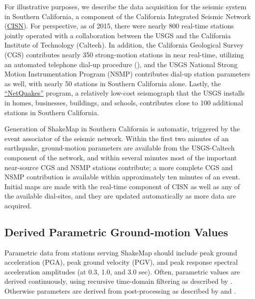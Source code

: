 \documentclass[letterpaper,10pt,english]{sphinxmanual}
\begin{document}
For illustrative purposes, we describe the data acquisition for the seismic system in
Southern California, a component of the California Integrated Seismic Network (\href{http://www.cisn.org}{CISN}).
For perspective, as of 2015, there were nearly 800 real-time stations jointly operated with
a collaboration between the USGS and the California Institute of Technology (Caltech). In addition, the California Geological Survey (CGS)
contributes nearly 350 strong-motion stations in near real-time, utilizing an automated
telephone dial-up procedure ({\hyperref[references:shakal1998]{}}), and the USGS National Strong Motion
Instrumentation Program (NSMP) contributes dial-up station parameters as well, with
nearly 50 stations in Southern California alone.  Lastly, the
\href{http://earthquake.usgs.gov/monitoring/netquakes/map}{``NetQuakes''} program, a
relatively low-cost seismograph that the USGS installs in homes, businesses, buildings, and
schools, contributes close to 100 additional stations in Southern California.

Generation of ShakeMap in Southern California is automatic, triggered by the event
associator of the seismic network.  Within the first two minutes of an earthquake, ground-motion
parameters are available from the USGS-Caltech component of the network, and
within several minutes most of the important near-source CGS and NSMP stations contribute; a
more complete CGS and NSMP contribution is available within approximately
ten minutes of an event.  Initial maps are made with the real-time component of CISN as
well as any of the available dial-sites, and they are updated automatically as more data
are acquired.


\subsection{Derived Parametric Ground-motion Values}
\label{tg_parameters:derived-parametric-ground-motion-values}
Parametric data from stations serving ShakeMap should include peak ground acceleration
(PGA), peak ground velocity (PGV), and peak response spectral acceleration amplitudes
(at 0.3, 1.0, and 3.0 sec).  Often, parametric values are derived continuously, using
recursive time-domain filtering as described by {\hyperref[references:kanamori1999]{}}.  Otherwise
parameters are derived from post-processing as described by {\hyperref[references:shakal1998]{}} and
{\hyperref[references:converse1992]{}}.
\end{document}
